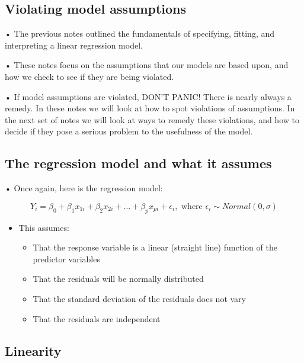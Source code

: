 \documentclass[
  letterpaper,
  DIV=11,
  numbers=noendperiod]{scrreprt}
\begin{document}
\hypertarget{violating-model-assumptions}{%
\subsection{Violating model
assumptions}\label{violating-model-assumptions}}

• The previous notes outlined the fundamentals of specifying, fitting,
and interpreting a linear regression model.

• These notes focus on the assumptions that our models are based upon,
and how we check to see if they are being violated.

• If model assumptions are violated, DON'T PANIC! There is nearly always
a remedy. In these notes we will look at how to spot violations of
assumptions. In the next set of notes we will look at ways to remedy
these violations, and how to decide if they pose a serious problem to
the usefulness of the model.

\hypertarget{the-regression-model-and-what-it-assumes}{%
\subsection{The regression model and what it
assumes}\label{the-regression-model-and-what-it-assumes}}

• Once again, here is the regression model:

\[
Y_i = \beta_0 + \beta_1x_{1i} + \beta_2x_{2i} + \dots + \beta_px_{pi} + \epsilon_i, \text{ where } \epsilon_i \sim Normal(0,\sigma)
\]

\begin{itemize}
\item
  This assumes:

  \begin{itemize}
  \item
    That the response variable is a linear (straight line) function of
    the predictor variables
  \item
    That the residuals will be normally distributed
  \item
    That the standard deviation of the residuals does not vary
  \item
    That the residuals are independent
  \end{itemize}
\end{itemize}

\hypertarget{linearity}{%
\subsection{Linearity}\label{linearity}}
\end{document}
